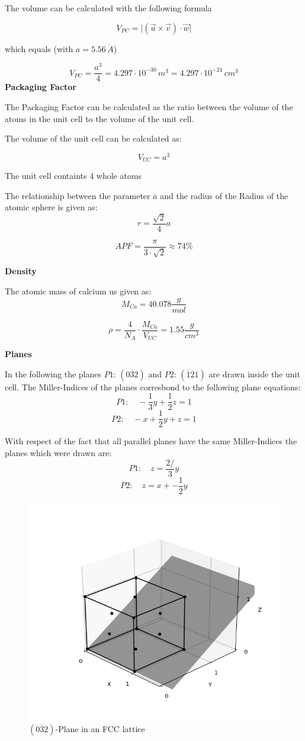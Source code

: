 The volume can be calculated with the following formula

$$V_{PC} = \vert (\vec{u} \times \vec{v})  \cdot \vec{w} \vert$$

which equals (with $a = 5.56 \, \mathring{A}$)

$$V_{PC} = \frac{a^3}{4} = 4.297 \cdot 10^{-30} \,m^3 = 4.297 \cdot 10^{-24} \,cm^3$$
\textbf{Packaging Factor}

The Packaging Factor can be calculated as the ratio between the
volume of the atoms in the unit cell to the volume of the unit cell.

The volume of the unit cell can be calculated as:

$$V_{UC} = a^3$$


The unit cell containts 4 whole atoms 

The relationship between the parameter $a$ and the radius of the Radius of the atomic sphere is given as:
$$r = \frac{\sqrt{2}}{4} a $$

$$APF = \frac{\pi}{3 \cdot \sqrt{2}} \approx 74\%$$


\textbf{Density}

The atomic mass of calcium us given as:
$$M_{Ca} = 40.078 \frac{g}{mol}$$


$$\rho = \frac{4}{N_A} \cdot \frac{M_{Ca}}{V_{UC}} = 1.55 \frac{g}{cm^3}$$


\textbf{Planes}

In the following the planes $P1: \, (0\overline{3}2)$ and $P2: \,(\overline{1}21)$ are drawn inside the unit cell.
The Miller-Indices of the planes corresbond to the following plane equations:
$$P1: \quad -\frac{1}{3} y + \frac{1}{2} z = 1$$
$$P2: \quad -x +\frac{1}{2} y + z = 1$$

With respect of the fact that all parallel planes have the same Miller-Indices the planes which were drawn are:
$$P1: \quad z = \frac{2/}{3}y$$
$$P2: \quad z = x + -\frac{1}{2}y$$

\begin{figure}[H]
	\centering
	\includegraphics[width=0.6\linewidth]{Graphics/Chapter1/PLANE032}
	\caption{$(0\overline{3}2)$-Plane in an FCC lattice}
	\label{}
\end{figure}


